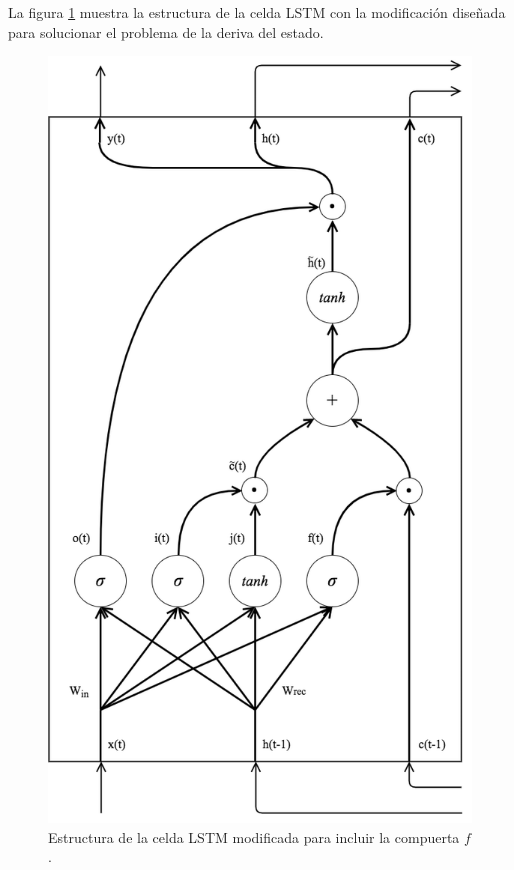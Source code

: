 \documentclass{article}
\begin{document}
	La figura \ref{vanillaLSTM} muestra la estructura de la celda LSTM con la modificación diseñada para solucionar el problema de la deriva del estado.
	\begin{figure}[H]
		\centering
		\includegraphics[scale=0.2]{vanillaLSTM.png}
		\caption{Estructura de la celda LSTM modificada para incluir la compuerta $f$.}
		\label{vanillaLSTM}
	\end{figure}
	
\end{document}
